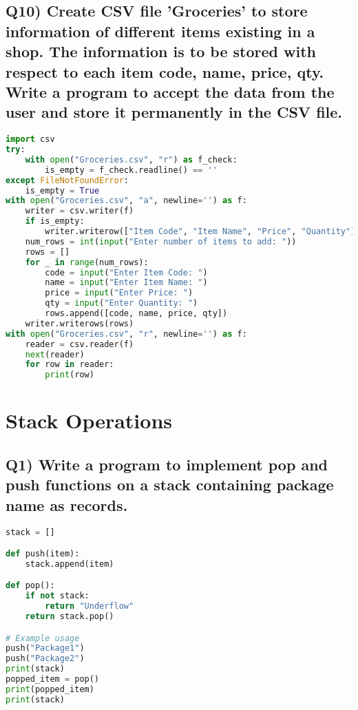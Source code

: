 \documentclass{article}
\begin{document}
\subsection*{Q10) Create CSV file 'Groceries' to store information of different items existing in a shop. The information is to be stored with respect to each item code, name, price, qty. Write a program to accept the data from the user and store it permanently in the CSV file.}
\begin{lstlisting}[language=Python]
import csv
try:
    with open("Groceries.csv", "r") as f_check:
        is_empty = f_check.readline() == ''
except FileNotFoundError:
    is_empty = True
with open("Groceries.csv", "a", newline='') as f:
    writer = csv.writer(f)
    if is_empty:
        writer.writerow(["Item Code", "Item Name", "Price", "Quantity"])
    num_rows = int(input("Enter number of items to add: "))
    rows = []
    for _ in range(num_rows):
        code = input("Enter Item Code: ")
        name = input("Enter Item Name: ")
        price = input("Enter Price: ")
        qty = input("Enter Quantity: ")
        rows.append([code, name, price, qty])
    writer.writerows(rows)
with open("Groceries.csv", "r", newline='') as f:
    reader = csv.reader(f)
    next(reader)
    for row in reader:
        print(row)
\end{lstlisting}

\section{Stack Operations}

\subsection*{Q1) Write a program to implement pop and push functions on a stack containing package name as records.}
\begin{lstlisting}[language=Python]
stack = []

def push(item):
    stack.append(item)

def pop():
    if not stack:
        return "Underflow"
    return stack.pop()

# Example usage
push("Package1")
push("Package2")
print(stack)
popped_item = pop()
print(popped_item)
print(stack)
\end{lstlisting}
\end{document}
